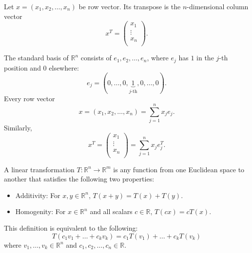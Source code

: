 \begin{definition}
    Let \(x = (x_1, x_2, \dots , x_n)\) be row vector. Its transpose is the \(n\)-dimensional column vector 
    \[
        x^T = \begin{pmatrix}
             x_1 \\
             \vdots \\
             x_n \\
        \end{pmatrix}.
    \]  
\end{definition}

\begin{definition}
    The standard basis of \(\mathbb{R} ^n\) consists of \(e_1, e_2, \dots , e_n\), where \(e_j\) has \(1\) in the \(j\)-th position and \(0\) elsewhere: 
    \[
        e_j = (0, \dots , 0, \underbrace{1}_{j\text{-th}}, 0, \dots , 0).
    \]      
    Every row vector
    \[
        x = (x_1, x_2, \dots , x_n) = \sum_{j=1}^n x_j e_j. 
    \]
    Similarly, 
    \[
        x^T = \begin{pmatrix}
             x_1 \\
             \vdots \\
             x_n \\
        \end{pmatrix}= \sum_{j=1}^n x_j e_j^T.
    \]
\end{definition}

\begin{definition}
    A linear transformation \(T: \mathbb{R} ^n \to \mathbb{R} ^m\) is any function from one Euclidean space to another that satisfies the following two properties:
    \begin{itemize}
        \item [(a)] Additivity: For \(x, y \in \mathbb{R} ^n\), \(T(x + y) = T(x) + T(y)\). 
        \item [(b)] Homogenity: For \(x \in \mathbb{R} ^n\) and all scalars \(c \in \mathbb{R} \), \(T(cx) = cT(x)\).     
    \end{itemize} 
\end{definition}

\begin{remark}
    This definition is equivalent to the following: 
    \[
        T(c_1 v_1 + \dots + c_k v_k) = c_1 T(v_1) + \dots + c_k T(v_k)
    \]
    where \(v_1, \dots , v_k \in \mathbb{R} ^n\) and \(c_1, c_2, \dots , c_n \in \mathbb{R} \).  
\end{remark}

